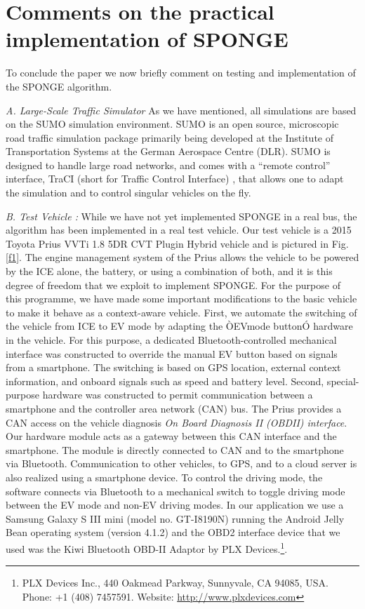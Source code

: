 \documentclass[journal]{IEEEtran}
\begin{document}
\section{Comments on the practical implementation of SPONGE}

To conclude the paper we now briefly comment on testing and implementation of the SPONGE algorithm.\newline

{\em A. Large-Scale Traffic Simulator} As we have mentioned, all simulations are based on the SUMO simulation environment. SUMO \cite{SUMORef} is an open source, microscopic road traffic simulation package primarily being developed at the Institute of Transportation Systems at the German Aerospace Centre (DLR). SUMO is designed to handle large road networks, and comes with a ``remote control'' interface, TraCI (short for Traffic Control Interface) \cite{b4}, that allows one to adapt the simulation and to control singular vehicles on the fly.\newline 

{\em B.  Test Vehicle :} While we have not yet implemented SPONGE in a real bus, the algorithm has been implemented  in a real test vehicle.  Our test vehicle is a 2015 Toyota Prius VVTi 1.8 5DR CVT Plugin Hybrid vehicle and is pictured in Fig. \ref{f1}.  The engine management system of the Prius allows the vehicle to be powered by the ICE alone, the battery, or using a combination of both, and it is this degree of freedom that we exploit to implement SPONGE.  For the purpose of this programme, we have made some important modifications to the basic vehicle to make it behave as a context-aware vehicle. First, we automate the switching of the vehicle from ICE to EV mode by adapting the ÒEVmode buttonÓ hardware in the vehicle. For this purpose, a dedicated Bluetooth-controlled mechanical interface was constructed to override the manual EV button based on signals from a smartphone. The switching is based on GPS location, external context information, and onboard signals such as speed and battery level. Second, special-purpose hardware was constructed to permit communication between a smartphone and the controller area network (CAN) bus. The Prius provides a CAN access on the vehicle diagnosis {\em On Board Diagnosis II (OBDII) interface}. Our hardware module acts as a gateway between this CAN interface and the smartphone.
The module is directly connected to CAN and to the smartphone via Bluetooth.  Communication to other vehicles, to GPS, and to a cloud server is also realized using a smartphone device. To control the driving mode, the software connects via Bluetooth to a mechanical switch to
toggle driving mode between the EV mode and non-EV driving modes.  In our application we use a Samsung Galaxy S III mini (model no. GT-I8190N) running the Android Jelly Bean operating system (version 4.1.2) and the OBD2 interface device that we used was the Kiwi Bluetooth OBD-II Adaptor by PLX Devices.\footnote{PLX Devices Inc., 440 Oakmead Parkway, Sunnyvale, CA 94085, USA.  Phone:  +1 (408) 7457591.  Website:  \url{http://www.plxdevices.com}}. \newline
\end{document}
